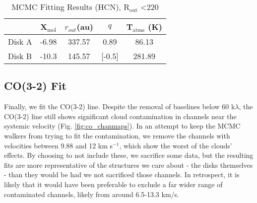 \begin{table}
  \centering
  \begin{threeparttable}
    \caption{MCMC Fitting Results (HCN), R$_\text{out}$ \textless 220}
    \label{table:fit_hcn}
    \renewcommand{\arraystretch}{1.2}
    \begin{tabular}{l c c c c }
      \toprule \toprule
                & X$_\text{mol}$ & $r_{out}$(\si{au})& $q$ & T$_\text{atms}$ (K) \\
      \midrule %
        Disk A  & -6.98          & 337.57             & 0.89 & 86.13 \\
        Disk B  & -10.3          & 145.57             & [-0.5] & 281.89 \\
      \bottomrule
    \end{tabular}
    \begin{tablenotes}\footnotesize
    \end{tablenotes}
  \end{threeparttable}
\end{table}




\subsection{CO(3-2) Fit}
\label{subsection:co_fit}
Finally, we fit the CO(3-2) line. Despite the removal of baselines below 60 k$\lambda$, the CO(3-2) line still shows significant cloud contamination in channels near the systemic velocity (Fig. \ref{fig:co_chanmaps}). In an attempt to keep the MCMC walkers from trying to fit the contamination, we remove the channels with velocities between 9.88 and 12 km s$^{-1}$, which show the worst of the clouds' effects. By choosing to not include these, we sacrifice some data, but the resulting fits are more representative of the structures we care about - the disks themselves - than they would be had we not sacrificed those channels. In retrospect, it is likely that it would have been preferable to exclude a far wider range of contaminated channels, likely from around 6.5-13.3 km/s.


